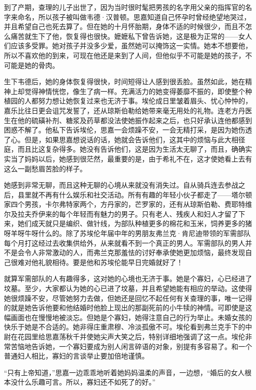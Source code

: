 \par 到了产期，查理的儿子出世了，因为当时很时髦把男孩的名字用父亲的指挥官的名字来命名，所以孩子被叫做韦德·汉普顿。思嘉知道自己怀孕时曾经绝望地哭过，并且希望自己也死去算了。但在她的十月怀胎期，身体不适的时候很少，而且不怎么痛苦就生下了他，恢复得也很快。嬷嬷私下曾告诉她，这是极为正常的——女人们应该多受罪。她对孩子并没多少爱，虽然她可以掩饰这一实情。她本不想要他，所以不喜欢他的到来，可现在他还是来到了人间，但他似乎不可能是她的孩子，不可能是她的骨肉。
\par 生下韦德后，她的身体恢复得很快，时间短得让人感到很丢脸。虽然如此，她在精神上却觉得神情恍惚，像生了病一样。充满活力的她变得萎靡不振的，即使整个种植园的人都努力想让她恢复过来也无济于事。埃伦成日里皱着眉头、忧心忡忡的，嘉乐比往日更会诅咒发誓了，还从琼斯伯勒给她带来毫无用处的礼物。连老方丹医生在他的硫磺补剂、糖浆及药草都没法使她振作起来之后，也只好承认连他都感到困惑不解了。他私下告诉埃伦，思嘉一会烦躁不安，一会无精打采，是因为她伤透了心。但是，如果思嘉想说话的话，她就会告诉他们，这其中的烦恼与此大相径庭，而且比这复杂得多。她没有告诉他们，这是因为生活太无聊了，而且，确确实实当了妈妈以后，她感到很茫然，最重要的是，由于希礼不在，这才使她看上去有这么一副愁眉苦脸的样子。
\par 她感到非常无聊，而且这种无聊的心境从来就没有消失过。自从骑兵连去参战之后，县里就不再有什么娱乐和社交活动。所有有趣的年轻小伙子都走了——塔尔顿家四个男孩，卡尔弗特家两个，方丹家的，芒罗家的，还有从琼斯伯勒、费耶特维尔及拉夫乔伊来的每个年轻而有魅力的男子。只有老人、残疾人和妇人才留了下来，她们成天就只是编织、做针线，为部队种植更多的棉花和玉米，饲养更多的猪呀羊呀牛呀什么的。除了苏埃伦年届中年的男朋友弗兰克·肯尼迪带领的军需部队每个月打这经过去收集供给外，从来就看不到一个真正的男人。军需部队的男人并不是会令人非常激动的人，而弗兰克那羞怯的讨好奉承使她更加烦恼，最终发现自己很难对他礼貌相待。要是他和苏埃伦能早日完婚就好了！
\par 就算军需部队的人有趣得多，这对她的心境也无济于事。她是个寡妇，心已经进了坟墓。至少，大家都认为她的心已进了坟墓，并且希望她能有相应的举动。这使得她很烦躁不安，尽管她努力去做，但她还是回忆不起任何有关查理的事，唯一记得的就是她告诉他要和他结婚时他脸上现出的那副死前的小牛犊的神情。可即使是这幅画面也在慢慢地被淡忘。但她是个寡妇，她得注意自己的行为举止。未婚女孩的快乐于她是不合适的。她非得庄重肃穆、冷淡孤傲不可。埃伦看到弗兰克手下的中尉在花园里给思嘉荡秋千并使她尖声大笑之后，特别详细地强调了这一点。埃伦非常苦恼地告诉她，一个寡妇要成为别人闲言碎语的对象，别提有多容易了。和一个普通妇人相比，寡妇的言谈举止要加倍地谨慎。
\par “只有上帝知道，”思嘉一边乖乖地听着她妈妈温柔的声音，一边想，“婚后的女人根本没什么乐趣可言。所以，寡妇还不如死了的好。”
